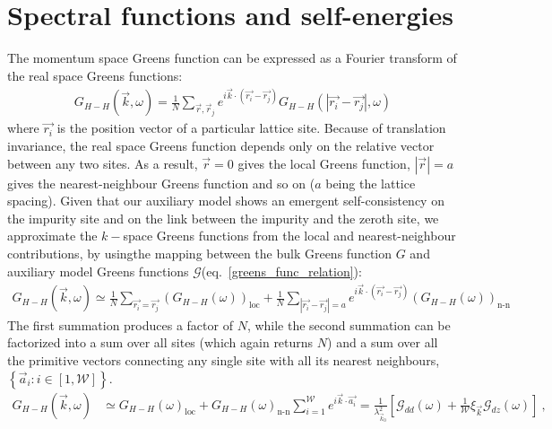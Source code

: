\documentclass{report}
\numberwithin{equation}{section}
\begin{document}
\section{Spectral functions and self-energies}

The momentum space Greens function can be expressed as a Fourier transform of the real space Greens functions:
\begin{equation}\begin{aligned}
	G_{H-H} (\vec k, \omega) = \frac{1}{N}\sum_{\vec r, \vec r_j}e^{i \vec{k}\cdot\left(\vec{r_i} - \vec {r_j}\right)}G_{H-H} (|\vec{r_i} - \vec {r_j}|, \omega)
\end{aligned}\end{equation}
where $\vec{r_i}$ is the position vector of a particular lattice site. Because of translation invariance, the real space Greens function depends only on the relative vector between any two sites. As a result, $\vec r=0$ gives the local Greens function, $|\vec r|=a$ gives the nearest-neighbour Greens function and so on ($a$ being the lattice spacing). Given that our auxiliary model shows an emergent self-consistency on the impurity site and on the link between the impurity and the zeroth site, we approximate the \(k-\)space Greens functions from the local and nearest-neighbour contributions, by usingthe mapping between the bulk Greens function \(G\) and auxiliary model Greens functions \(\mathcal{G}\)(eq.~\ref{greens_func_relation}):
\begin{equation}\begin{aligned}
	G_{H-H} (\vec k, \omega) \simeq \frac{1}{N}\sum_{\vec{r_i} = \vec {r_j}}\left(G_{H-H} (\omega)\right) _\text{loc} + \frac{1}{N}\sum_{|\vec{r_i} - \vec {r_j}|=a} e^{i \vec{k}\cdot\left(\vec{r_i} - \vec {r_j}\right)}\left(G_{H-H} (\omega)\right)_\text{n-n}
\end{aligned}\end{equation}
The first summation produces a factor of $N$, while the second summation can be factorized into a sum over all sites (which again returns $N$) and a sum over all the primitive vectors connecting any single site with all its nearest neighbours, $\left\{ \vec a_i: i \in \left[1, \mathcal{W}\right]\right\}$.
\begin{equation}\begin{aligned}
	\label{k_Gf_siam}
	G_{H-H} (\vec k, \omega) &\simeq G_{H-H} (\omega)_\text{loc} + G_{H-H} (\omega)_\text{n-n}\sum_{i=1}^{\mathcal{W}} e^{i \vec{k}\cdot\vec {a_i}} = \frac{1}{\lambda_{\vec k_0}^2}\left[\mathcal{G}_{dd}(\omega) + \frac{1}{\mathcal{W}}\xi_{\vec k}\mathcal{G}_{dz}(\omega) \right]~,
\end{aligned}\end{equation}
\end{document}
